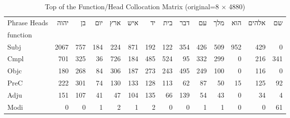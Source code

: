 \begin{table}[htbp!]
\centering
\caption{Top of the Function/Head Collocation Matrix (original=8 × 4880) }
\label{table:colexmatrix}
\begin{adjustbox}{width=1\textwidth}
\begin{tabular}{lrrrrrrrrrrrrr}
\toprule
Phrase Heads &  \texthebrew{יהוה} &  \texthebrew{בן} &  \texthebrew{יום} &  \texthebrew{ארץ} &  \texthebrew{איש} &  \texthebrew{יד} &  \texthebrew{בית} &  \texthebrew{דבר} &  \texthebrew{עם} &  \texthebrew{מלך} &  \texthebrew{הוא} &  \texthebrew{אלהים} &  \texthebrew{שם} \\
function &                    &                  &                   &                   &                   &                  &                   &                   &                  &                   &                   &                     &                  \\
\midrule
Subj     &               2067 &              757 &               184 &               224 &               871 &              192 &               122 &               354 &              426 &               509 &               952 &                 429 &                0 \\
Cmpl     &                701 &              325 &                36 &               726 &               184 &              485 &               524 &                95 &              332 &               299 &                 0 &                 216 &              341 \\
Objc     &                180 &              268 &                84 &               306 &               187 &              273 &               243 &               495 &              249 &               100 &                 0 &                 116 &                0 \\
PreC     &                222 &              301 &                74 &               130 &               133 &              128 &               113 &                62 &               87 &                50 &                15 &                 125 &               92 \\
Adju     &                151 &              107 &                41 &                47 &               104 &              135 &                66 &               139 &               54 &                43 &                 0 &                  34 &                4 \\
Modi     &                  0 &                0 &                 1 &                 2 &                 1 &                2 &                 0 &                 0 &                1 &                 1 &                 0 &                   0 &               61 \\

\end{tabular}
\end{adjustbox}
\end{table}
